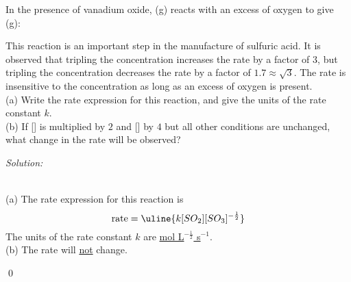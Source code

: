 \documentclass[12pt]{article}
\newenvironment{problem}[2][Problem]{\begin{trivlist}
\item[\hskip \labelsep {\bfseries #1}\hskip \labelsep {\bfseries #2.}]}{\end{trivlist}}
\newenvironment{sol}
    {\emph{Solution:}
    }
    {
    \qed
    }
\begin{document}
\begin{problem}{18.6}
In the presence of vanadium oxide, (g) reacts with an excess of oxygen to give (g):
\begin{center}
\end{center}
This reaction is an important step in the manufacture of sulfuric acid. It is observed that tripling the  concentration increases the rate by a factor of $3$, but tripling the  concentration decreases the rate by a factor of $1.7\approx\sqrt{3}$. The rate is insensitive to the  concentration as long as an
excess of oxygen is present.\\
(a) Write the rate expression for this reaction, and give the units of the rate constant $k$.\\
(b) If [] is multiplied by $2$ and [] by $4$ but all other conditions are unchanged, what change in the rate will be observed?
\end{problem}
\begin{sol}
\\(a) The rate expression for this reaction is
\[
\text{rate}=\uline{k[SO_2][SO_3]^{-\frac{1}{2}}}
\]
The units of the rate constant $k$ are \uline{mol L$^{-\frac{1}{2}}$ s$^{-1}$}.
\\(b) The rate will \uline{not} change.
\end{sol}
\end{document}
